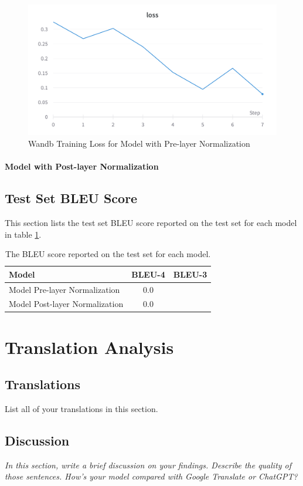\documentclass[11pt]{article}
\begin{document}
\begin{figure}[hbt!]
\centering
\includegraphics[width=0.65\linewidth]{./wandb_loss.png}
\caption{Wandb Training Loss for Model with Pre-layer Normalization}
\label{fig:train_loss_wo_attention}
\end{figure}

\paragraph{Model with Post-layer Normalization}


\subsection{Test Set BLEU Score}
This section lists the test set BLEU score reported on the test set for each model in table \ref{tab:bleu}.
\begin{table}[h]
\centering
\begin{tabular}{lcc} \toprule
Model                          & BLEU-4 &  BLEU-3 \\ \midrule
Model Pre-layer Normalization  & 0.0    \\
Model Post-layer Normalization & 0.0    \\
\bottomrule
\end{tabular}
\caption{The BLEU score reported on the test set for each model.}
\label{tab:bleu}
\end{table}

\section{Translation Analysis}

\subsection{Translations}

List all of your translations in this section.

\subsection{Discussion}
{\it In this section, write a brief discussion on your findings. Describe the quality of
those sentences. How's your model compared with Google Translate or ChatGPT?}
\end{document}
